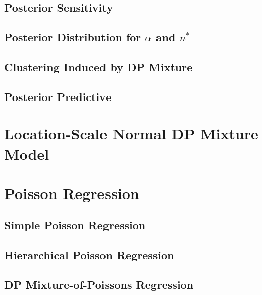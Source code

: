 \documentclass{article}
\def\beginmyfig{\begin{figure}[htbp]\begin{center}}
\def\endmyfig{\end{center}\end{figure}}
\begin{document}
\subsection{Posterior Sensitivity}
\subsection{Posterior Distribution for $\alpha$ and $n^*$}
\subsection{Clustering Induced by DP Mixture}
\subsection{Posterior Predictive}

\section{Location-Scale Normal DP Mixture Model}
\section{Poisson Regression}
\subsection{Simple Poisson Regression}
\subsection{Hierarchical Poisson Regression}
\subsection{DP Mixture-of-Poissons Regression}
\end{document}
